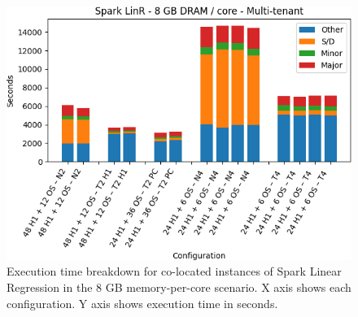 \begin{figure}[thbp]

    \includegraphics[width=\linewidth]{./fig/linr128.png}
    \caption{Execution time breakdown for co-located instances of Spark
    Linear Regression in the 8 GB memory-per-core scenario. X axis shows each configuration.
Y axis shows execution time in seconds.}
    \label{fig:linr128}
\end{figure}

